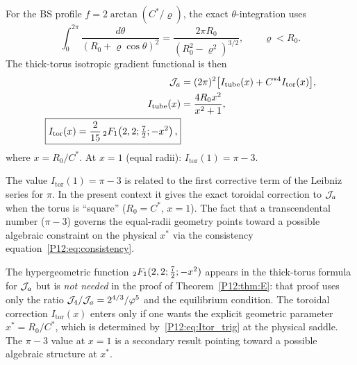 \begin{theorem}
\label{P12:thm:D}
For the BS profile $f=2\arctan(C^*/\varrho)$,
the exact $\theta$-integration uses
\begin{equation}
  \int_0^{2\pi}\frac{d\theta}{(R_0+\varrho\cos\theta)^2}
  = \frac{2\pi R_0}{(R_0^2-\varrho^2)^{3/2}},
  \qquad \varrho < R_0.
  \label{P12:eq:theta_exact}
\end{equation}
The thick-torus isotropic gradient functional is then
\begin{align}
  \mathcal{J}_a &= (2\pi)^2\bigl[I_{\mathrm{tube}}(x)+ C^{*4}I_{\mathrm{tor}}(x)\bigr],
  \label{P12:eq:J2a_thick}\\
  I_{\mathrm{tube}}(x) &= \frac{4R_0 x^2}{x^2+1},
  \label{P12:eq:I_tube}\\
  \boxed{
  I_{\mathrm{tor}}(x) = \frac{2}{15}\,{}_2F_1\!\left(2,2;\tfrac{7}{2};-x^2\right),
  }
  \label{P12:eq:Itor}
\end{align}
where $x=R_0/C^*$.
At $x=1$ (equal radii): $I_{\mathrm{tor}}(1)=\pi-3$.
\end{theorem}

\begin{remark}
\label{P12:rem:pi3_leibniz}
The value $I_{\mathrm{tor}}(1)=\pi-3$ is related to the first
corrective term of the Leibniz series for $\pi$.
In the present context it gives the exact toroidal correction to $\mathcal{J}_a$
when the torus is ``square'' ($R_0=C^*$, $x=1$).
The fact that a transcendental number ($\pi-3$) governs the
equal-radii geometry points toward a possible algebraic constraint
on the physical $x^*$ via the consistency equation~\eqref{P12:eq:consistency}.
\end{remark}

\begin{remark}
\label{P12:rem:Itor_role}
The hypergeometric function ${}_2F_1(2,2;\frac{7}{2};-x^2)$ appears
in the thick-torus formula for $\mathcal{J}_a$ but is \emph{not needed}
in the proof of Theorem~\ref{P12:thm:E}: that proof uses only the
ratio $\mathcal{J}_4/\mathcal{J}_a=2^{4/3}/\varphi^5$ and the equilibrium condition.
The toroidal correction $I_{\mathrm{tor}}(x)$ enters only if one
wants the explicit geometric parameter $x^*=R_0/C^*$, which is
determined by~\eqref{P12:eq:Itor_trig} at the physical saddle.
The $\pi-3$ value at $x=1$ is a secondary result pointing toward
a possible algebraic structure at $x^*$.
\end{remark}

